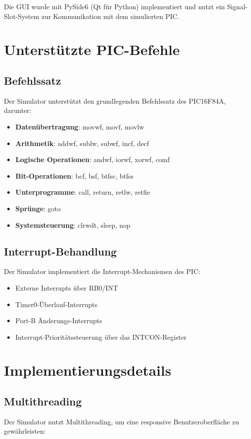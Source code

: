 \documentclass[a4paper,11pt]{report}
\begin{document}
Die GUI wurde mit PySide6 (Qt für Python) implementiert und nutzt ein Signal-Slot-System zur Kommunikation mit dem simulierten PIC.

\chapter{Unterstützte PIC-Befehle}

\section{Befehlssatz}
Der Simulator unterstützt den grundlegenden Befehlssatz des PIC16F84A, darunter:

\begin{itemize}
    \item \textbf{Datenübertragung}: movwf, movf, movlw
    \item \textbf{Arithmetik}: addwf, sublw, subwf, incf, decf
    \item \textbf{Logische Operationen}: andwf, iorwf, xorwf, comf
    \item \textbf{Bit-Operationen}: bcf, bsf, btfsc, btfss
    \item \textbf{Unterprogramme}: call, return, retlw, retfie
    \item \textbf{Sprünge}: goto
    \item \textbf{Systemsteuerung}: clrwdt, sleep, nop
\end{itemize}

\section{Interrupt-Behandlung}
Der Simulator implementiert die Interrupt-Mechanismen des PIC:

\begin{itemize}
    \item Externe Interrupts über RB0/INT
    \item Timer0-Überlauf-Interrupts
    \item Port-B Änderungs-Interrupts
    \item Interrupt-Prioritätssteuerung über das INTCON-Register
\end{itemize}

\chapter{Implementierungsdetails}

\section{Multithreading}
Der Simulator nutzt Multithreading, um eine responsive Benutzeroberfläche zu gewährleisten:
\end{document}
